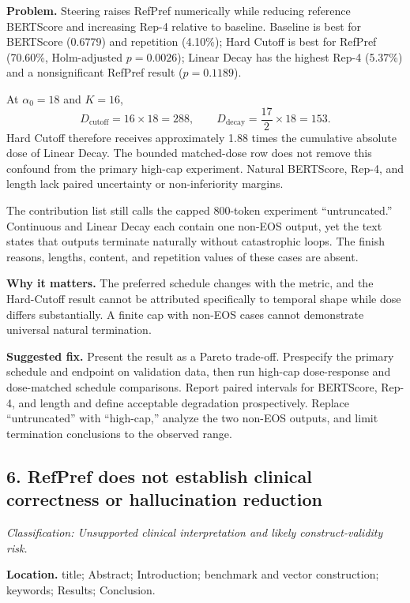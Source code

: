 \documentclass[11pt]{article}
\newcommand{\findinglabel}[1]{\textbf{#1}}
\newcommand{\classification}[1]{\textit{Classification: #1.}}
\begin{document}
\findinglabel{Problem.} Steering raises RefPref numerically while reducing reference BERTScore and increasing Rep-4 relative to baseline.  Baseline is best for BERTScore (0.6779) and repetition (4.10\%); Hard Cutoff is best for RefPref (70.60\%, Holm-adjusted $p=0.0026$); Linear Decay has the highest Rep-4 (5.37\%) and a nonsignificant RefPref result ($p=0.1189$).

At $\alpha_0=18$ and $K=16$,
\[
D_{\text{cutoff}}=16\times18=288,
\qquad
D_{\text{decay}}=\frac{17}{2}\times18=153.
\]
Hard Cutoff therefore receives approximately 1.88 times the cumulative absolute dose of Linear Decay.  The bounded matched-dose row does not remove this confound from the primary high-cap experiment.  Natural BERTScore, Rep-4, and length lack paired uncertainty or non-inferiority margins.

The contribution list still calls the capped 800-token experiment ``untruncated.''  Continuous and Linear Decay each contain one non-EOS output, yet the text states that outputs terminate naturally without catastrophic loops.  The finish reasons, lengths, content, and repetition values of these cases are absent.

\findinglabel{Why it matters.} The preferred schedule changes with the metric, and the Hard-Cutoff result cannot be attributed specifically to temporal shape while dose differs substantially.  A finite cap with non-EOS cases cannot demonstrate universal natural termination.

\findinglabel{Suggested fix.} Present the result as a Pareto trade-off.  Prespecify the primary schedule and endpoint on validation data, then run high-cap dose-response and dose-matched schedule comparisons.  Report paired intervals for BERTScore, Rep-4, and length and define acceptable degradation prospectively.  Replace ``untruncated'' with ``high-cap,'' analyze the two non-EOS outputs, and limit termination conclusions to the observed range.

\subsection*{6. RefPref does not establish clinical correctness or hallucination reduction}

\classification{Unsupported clinical interpretation and likely construct-validity risk}

\findinglabel{Location.} title; Abstract; Introduction; benchmark and vector construction; keywords; Results; Conclusion.
\end{document}
